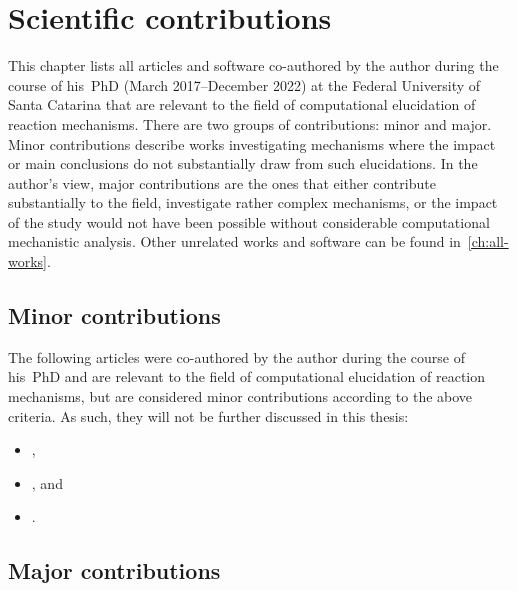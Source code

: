 \chapter{Scientific contributions}
\label{ch:contributions}

This chapter lists all articles and software co-authored by the author during
the course of his~PhD (March 2017--December 2022) at the Federal University of
Santa Catarina that are relevant to the field of computational elucidation of
reaction mechanisms.
There are two groups of contributions: minor and major.
Minor contributions describe works investigating mechanisms where the impact or
main conclusions do not substantially draw from such elucidations. In the
author's view, major contributions are the ones that either contribute
substantially to the field, investigate rather complex mechanisms, or the
impact of the study would not have been possible without considerable
computational mechanistic analysis.
Other unrelated works and software can be found in~\cref{ch:all-works}.

\section{Minor contributions}%
\label{sec:minor-contributions}

The following articles were co-authored by the author during the course of his~PhD
and are relevant to the field of computational elucidation of reaction
mechanisms, but are considered minor contributions according to the above criteria.
As such, they will not be further discussed in this thesis:
%
\begin{itemize}
	\item {},
	\item {}, and
	\item {}.
\end{itemize}

\section{Major contributions}%
\label{sec:major-contributions}


